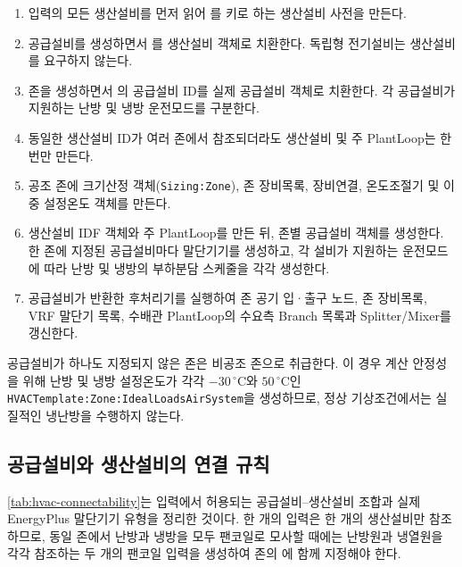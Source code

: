 \begin{enumerate}
  \item 입력의 모든 생산설비를 먼저 읽어 를 키로 하는 생산설비 사전을 만든다.
  \item 공급설비를 생성하면서 를 생산설비 객체로 치환한다. 독립형 전기설비는 생산설비를 요구하지 않는다.
  \item 존을 생성하면서 의 공급설비 ID를 실제 공급설비 객체로 치환한다. 각 공급설비가 지원하는 난방 및 냉방 운전모드를 구분한다.
  \item 동일한 생산설비 ID가 여러 존에서 참조되더라도 생산설비 및 주 PlantLoop는 한 번만 만든다.
  \item 공조 존에 크기산정 객체(\texttt{Sizing:Zone}), 존 장비목록, 장비연결, 온도조절기 및 이중 설정온도 객체를 만든다.
  \item 생산설비 IDF 객체와 주 PlantLoop를 만든 뒤, 존별 공급설비 객체를 생성한다. 한 존에 지정된 공급설비마다 말단기기를 생성하고, 각 설비가 지원하는 운전모드에 따라 난방 및 냉방의 부하분담 스케줄을 각각 생성한다.
  \item 공급설비가 반환한 후처리기를 실행하여 존 공기 입·출구 노드, 존 장비목록, VRF 말단기 목록, 수배관 PlantLoop의 수요측 Branch 목록과 Splitter/Mixer를 갱신한다.
\end{enumerate}

공급설비가 하나도 지정되지 않은 존은 비공조 존으로 취급한다. 이 경우 계산 안정성을 위해 난방 및 냉방 설정온도가 각각 $-30\,^{\circ}\mathrm{C}$와 $50\,^{\circ}\mathrm{C}$인 \texttt{HVACTemplate:Zone:IdealLoadsAirSystem}을 생성하므로, 정상 기상조건에서는 실질적인 냉난방을 수행하지 않는다.

\subsection{공급설비와 생산설비의 연결 규칙}

\cref{tab:hvac-connectability}는 입력에서 허용되는 공급설비--생산설비 조합과 실제 EnergyPlus 말단기기 유형을 정리한 것이다. 한 개의  입력은 한 개의 생산설비만 참조하므로, 동일 존에서 난방과 냉방을 모두 팬코일로 모사할 때에는 난방원과 냉열원을 각각 참조하는 두 개의 팬코일 입력을 생성하여 존의 에 함께 지정해야 한다.

